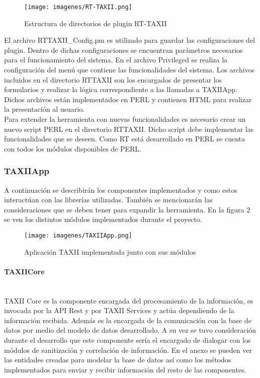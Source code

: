 \documentclass[11pt]{article}
\begin{document}
\begin{figure}[h!]
	\centering
	\texttt{[image: imagenes/RT-TAXII.png]}
	\caption{Estructura de directorios de plugin RT-TAXII}
	\label{fig.rt_taxii}
\end{figure}

El archivo RTTAXII\_Config.pm es utilizado para guardar las configuraciones del plugin. Dentro de dichas configuraciones se encuentran parámetros necesarios para el funcionamiento del sistema.
En el archivo Privileged se realiza la configuración del menú que contiene las funcionalidades del sistema.
Los archivos incluidos en el directorio RTTAXII son los encargados de presentar los formularios y realizar la lógica correspondiente a las llamadas a TAXIIApp. Dichos archivos están implementados en PERL y contienen HTML para realizar la presentación al usuario.\\

Para extender la herramienta con nuevas funcionalidades es necesario crear un nuevo script PERL en el directorio RTTAXII. Dicho script debe implementar las funcionalidades que se deseen. Como RT está desarrollado en PERL se cuenta con todos los módulos disponibles de PERL.

\subsubsection{TAXIIApp}
A continuación se describirán los componentes implementados y como estos interactúan con las librerías utilizadas.
También se mencionarán las consideraciones que se deben tener para expandir la herramienta.
En la figura 2 se ven los distintos módulos implementados durante el proyecto. 

\begin{figure}
	\centering
	\texttt{[image: imagenes/TAXIIApp.png]}
	\caption{Aplicación TAXII implementada junto con sus módulos}
	\label{fig.taxii_app}
\end{figure}

\paragraph{TAXIICore}\ \\
TAXII Core es la componente encargada del procesamiento de la información, es invocada por la API Rest y por TAXII Services y actúa dependiendo de la información recibida. Además es la encargada de la comunicación con la base de datos por medio del modelo de datos desarrollado. A su vez se tuvo consideración durante el desarrollo que este componente sería el encargado de dialogar con los módulos de sanitización y correlación de información. 
En el anexo se pueden ver las entidades creadas para modelar la base de datos así como los métodos implementados para enviar y recibir información del resto de las componentes.
\end{document}
